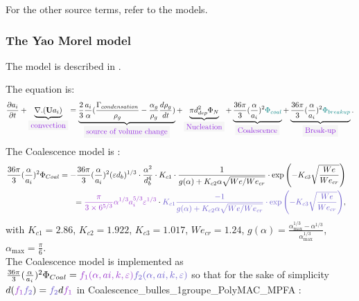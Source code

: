 For the other source terms, refer to the models.

%
\subsubsection{The Yao Morel model}
The model is described in \cite{YAO2004307}.

The equation is:
\begin{equation}
\frac{\partial a_{i}}{\partial t}+\underbrace{\nabla.(\mathbf{U} a_{i})}_{\colorbox{codebackground}{\color{codekeyword3} convection}}=\underbrace{\frac{2}{3}\frac{a_{i}}{\alpha}(\frac{\Gamma_{condensation}}{\rho_g}-\frac{\alpha_g}{\rho_g} \frac{d \rho_g}{d t})}_{\colorbox{codebackground}{\color{codekeyword3} source\ of\ volume\ change}}+\underbrace{\pi d_{dep}^2\Phi_N}_{\colorbox{codebackground}{\color{codekeyword3} Nucleation}}+\underbrace{\frac{36\pi}{3}(\frac{\alpha}{a_i})^2{\color{myteal}\Phi_{coal}}}_{\colorbox{codebackground}{\color{codekeyword3} Coalescence}}+\underbrace{\frac{36\pi}{3}(\frac{\alpha}{a_i})^2{\color{myteal}\Phi_{breakup}}}_{\colorbox{codebackground}{\color{codekeyword3}  Break-up}}.
\end{equation}
The {\colorbox{codebackground}{\color{codekeyword3} Coalescence}} model is :
\begin{equation}
\begin{aligned}
		\frac{36\pi}{3}(\frac{\alpha}{a_i})^2\Phi_{Coal} =- \frac{36\pi}{3}(\frac{\alpha}{a_i})^2 (\varepsilon d_b)^{1/3} \cdot \frac{\alpha^2}{d_b^4} \cdot K_{c1} \cdot \frac{1}{g(\alpha) + K_{c2}\alpha \sqrt{We/We_{cr}}} \cdot \text{exp}\left(-K_{c3} \sqrt{\frac{We}{We_{cr}}}\right)& & \\ = {\color{mydarkorchid} \frac{\pi}{3\times 6^{5/3}}\alpha^{1/3}a_i^{5/3}\varepsilon^{1/3}} \cdot {\color{myslateblue} K_{c1} \frac{-1}{g(\alpha) + K_{c2}\alpha \sqrt{We/We_{cr}}} \cdot \text{exp}\left(-K_{c3} \sqrt{\frac{We}{We_{cr}}}\right)},
\end{aligned}
\end{equation}
with $K_{c1} = 2.86$, $K_{c2} = 1.922$, $K_{c3} = 1.017$, $We_{cr} = 1.24$, $g(\alpha) = \frac{\alpha_\text{max}^{1/3}-\alpha^{1/3}}{\alpha_\text{max}^{1/3}}$, $\alpha_\text{max} = \frac{\pi}{6}$.\\
The {\colorbox{codebackground}{\color{codekeyword3} Coalescence}} model is implemented as $\frac{36\pi}{3}(\frac{\alpha}{a_i})^2\Phi_{Coal}={\color{mydarkorchid}f_1(\alpha,ai,k,\varepsilon)}{\color{myslateblue} f_2(\alpha,ai,k,\varepsilon)}$ so that for the sake of simplicity $d({\color{mydarkorchid}f_1}{\color{myslateblue} f_2})={\color{myslateblue} f_2}d{\color{mydarkorchid} f_1}$  in {\color{mydarkorchid} Coalescence_bulles_1groupe_PolyMAC_MPFA} :
